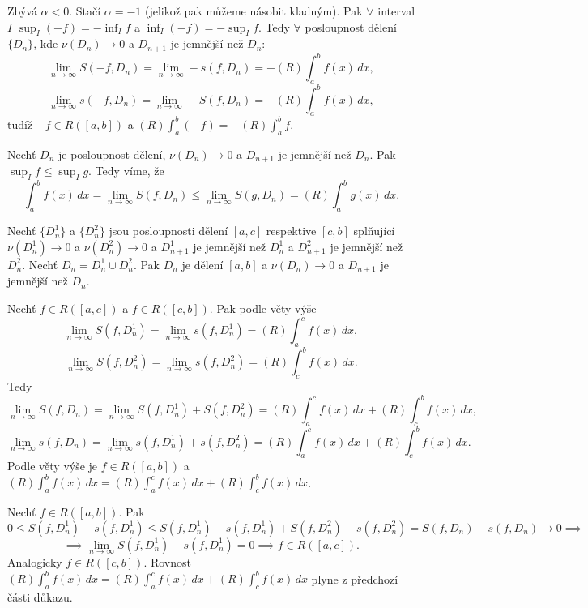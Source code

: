 \documentclass[12pt]{article}                   %
\begin{document}
\begin{veta}
\begin{dukazin}[a]
                Zbývá $\alpha < 0$. Stačí $\alpha = -1$ (jelikož pak můžeme násobit kladným). Pak $\forall$ interval $I$ $\sup_I (-f) = -\inf_I f$ a $\inf_I(-f) = -\sup_I f$. Tedy $\forall$ posloupnost dělení $\{D_n\}$, kde $\nu(D_n) \rightarrow 0$ a $D_{n+1}$ je jemnější než $D_n$:
                $$ \lim_{n \rightarrow ∞} S(-f, D_n) = \lim_{n \rightarrow ∞} - s(f, D_n) = - (R)\int_a^b f(x)\,dx, $$ 
                $$ \lim_{n \rightarrow ∞} s(-f, D_n) = \lim_{n \rightarrow ∞} - S(f, D_n) = - (R)\int_a^b f(x)\,dx, $$
                tudíž $-f \in R([a, b])$ a $(R)\int_a^b (-f) = -(R)\int_a^b f$.
            \end{dukazin}

            \begin{dukazin}[b]
                Nechť $D_n$ je posloupnost dělení, $\nu(D_n) \rightarrow 0$ a $D_{n+1}$ je jemnější než $D_n$. Pak $\sup_I f ≤ \sup_I g$. Tedy víme, že
                $$ \int_a^b f(x)\,dx = \lim_{n \rightarrow ∞} S(f, D_n) ≤ \lim_{n \rightarrow ∞} S(g, D_n) = (R)\int_a^b g(x)\,dx. $$
            \end{dukazin}

            \begin{dukazin}[c]
                Nechť $\{D_n^1\}$ a $\{D_n^2\}$ jsou posloupnosti dělení $[a, c]$ respektive $[c, b]$ splňující $\nu(D_n^1) \rightarrow 0$ a $\nu(D_n^2) \rightarrow 0$ a $D^1_{n+1}$ je jemnější než $D^1_n$ a $D^2_{n+1}$ je jemnější než $D^2_n$. Nechť $D_n = D_n^1 \cup D_n^2$. Pak $D_n$ je dělení $[a, b]$ a $\nu(D_n) \rightarrow 0$ a $D_{n+1}$ je jemnější než $D_n$.

                Nechť $f\in R([a, c])$ a $f \in R([c, b])$. Pak podle věty výše
                $$ \lim_{n \rightarrow ∞} S(f, D_n^1) = \lim_{n \rightarrow ∞} s(f, D_n^1) = (R)\int_a^c f(x)\,dx, $$
                $$ \lim_{n \rightarrow ∞} S(f, D_n^2) = \lim_{n \rightarrow ∞} s(f, D_n^2) = (R)\int_c^b f(x)\,dx. $$
                Tedy
                $$ \lim_{n \rightarrow ∞} S(f, D_n) = \lim_{n \rightarrow ∞} S(f, D_n^1) + S(f, D_n^2) = (R) \int_a^c f(x)\,dx + (R)\int_c^b f(x)\,dx, $$
                $$ \lim_{n \rightarrow ∞} s(f, D_n) = \lim_{n \rightarrow ∞} s(f, D_n^1) + s(f, D_n^2) = (R) \int_a^c f(x)\,dx + (R)\int_c^b f(x)\,dx. $$
                Podle věty výše je $f \in R([a, b])$ a $(R) \int_a^b f(x)\,dx = (R) \int_a^c f(x)\,dx + (R)\int_c^b f(x)\,dx$.

                Nechť $f \in R([a, b])$. Pak
                $$ 0 ≤ S(f, D_n^1) - s(f, D_n^1) ≤ S(f, D_n^1) - s(f, D_n^1) + S(f, D_n^2) - s(f, D_n^2) = S(f, D_n) - s(f, D_n) \rightarrow 0 \implies $$ 
                $$ \implies \lim_{n \rightarrow ∞} S(f, D_n^1) - s(f, D_n^1) = 0 \implies f \in R([a, c]). $$
                Analogicky $f \in R([c, b])$. Rovnost $(R) \int_a^b f(x)\,dx = (R) \int_a^c f(x)\,dx + (R) \int_c^b f(x)\,dx$ plyne z předchozí části důkazu.
            \end{dukazin}
        \end{veta}
\end{document}
